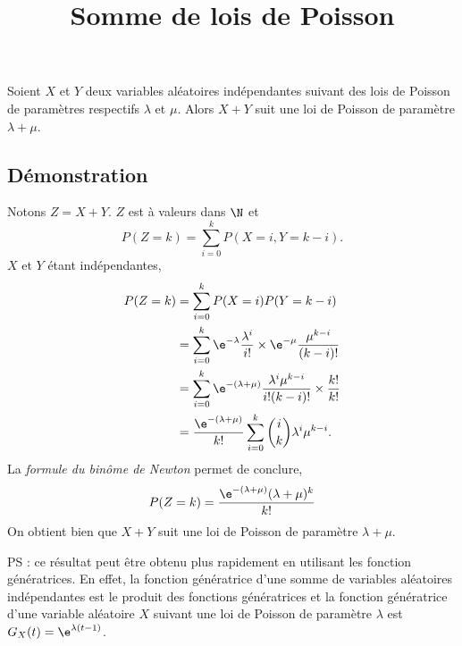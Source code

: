 \documentclass[fontsize=12pt,twoside=false,parskip=half]{scrartcl}
\title{Somme de lois de Poisson}
\date{}
\author{}
\begin{document}
\maketitle
   \begin{Theoreme}
      Soient $X$ et $Y$ deux variables aléatoires indépendantes suivant des lois
      de Poisson de paramètres respectifs $\lambda$ et $\mu$. Alors
      $X + Y$ suit une loi de Poisson de paramètre $\lambda + \mu$.
   \end{Theoreme}
   \subsection{Démonstration}
      Notons $Z = X + Y$. $Z$ est à valeurs dans $\N$ et
      \[
         P(Z = k) = \sum_{i = 0}^k P(X = i, Y = k - i).
      \]
      $X$ et $Y$ étant indépendantes,       
      \begin{align*}
         P(Z = k) &= \sum_{i = 0}^k P(X = i)P(Y = k - i)\\
                  &= \sum_{i = 0}^k \e^{-\lambda} \frac{\lambda^i}{i!} \times
                                    \e^{-\mu} \frac{\mu^{k - i}}{(k - i)!}\\
                  &= \sum_{i = 0}^k \e^{-(\lambda + \mu)} 
                                    \frac{\lambda^i \mu^{k - i}}{i!(k - i)!}  
                                    \times \frac{k!}{k!}\\
                  &= \frac{\e^{-(\lambda + \mu)}}{k!} 
                     \sum_{i = 0}^k \binom{i}{k} \lambda^i \mu^{k - i}.
      \end{align*}
      La \emph{formule du binôme de Newton} permet de conclure,
      \[
         P(Z = k) = \frac{\e^{-(\lambda + \mu)} (\lambda + \mu)^k}{k!}
      \]
      On obtient bien que $X + Y$ suit une loi de Poisson de paramètre 
      $\lambda + \mu$.
      
      PS : ce résultat peut être obtenu plus rapidement en utilisant les fonction
      génératrices. En effet, la fonction génératrice d’une somme de variables 
      aléatoires indépendantes est le produit des fonctions génératrices et 
      la fonction génératrice d’une variable aléatoire $X$ suivant une loi de
      Poisson de paramètre $\lambda$ est $G_X(t) = \e^{\lambda(t - 1)}$.
\end{document}
